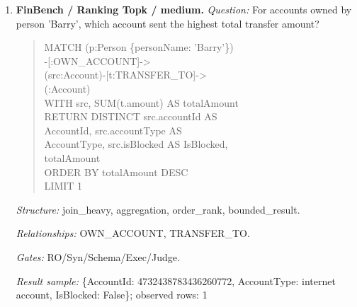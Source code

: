 \begin{enumerate}
\begin{quote}\scriptsize\ttfamily\raggedright\sloppy
MATCH (p:Person \{personName:\\
'Sossamon'\}) -[:OWN\_ACCOUNT]-\textgreater{}\\
(src:Account) -[:TRANSFER\_TO*1..2]-\textgreater{}\\
(dst:Account)\\
RETURN DISTINCT dst.accountId AS\\
AccountId, dst.accountType AS\\
AccountType, dst.isBlocked AS IsBlocked\\
LIMIT 300
\end{quote}
\textit{Structure:} join\_heavy, path, bounded\_result.\par
\textit{Relationships:} OWN\_ACCOUNT, TRANSFER\_TO.\par
\textit{Gates:} RO/Syn/Schema/Exec/Judge.\par
\textit{Result sample:} \{AccountId: 4687402787162554854, AccountType: credit card, IsBlocked: False\}; observed rows: 4
\item \textbf{FinBench / Ranking Topk / medium.}
\textit{Question:} For accounts owned by person 'Barry', which account sent the highest total transfer amount?
\begin{quote}\scriptsize\ttfamily\raggedright\sloppy
MATCH (p:Person \{personName: 'Barry'\})\\
-[:OWN\_ACCOUNT]-\textgreater{}\\
(src:Account)-[t:TRANSFER\_TO]-\textgreater{}\\
(:Account)\\
WITH src, SUM(t.amount) AS totalAmount\\
RETURN DISTINCT src.accountId AS\\
AccountId, src.accountType AS\\
AccountType, src.isBlocked AS IsBlocked,\\
totalAmount\\
ORDER BY totalAmount DESC\\
LIMIT 1
\end{quote}
\textit{Structure:} join\_heavy, aggregation, order\_rank, bounded\_result.\par
\textit{Relationships:} OWN\_ACCOUNT, TRANSFER\_TO.\par
\textit{Gates:} RO/Syn/Schema/Exec/Judge.\par
\textit{Result sample:} \{AccountId: 4732438783436260772, AccountType: internet account, IsBlocked: False\}; observed rows: 1

\end{enumerate}
